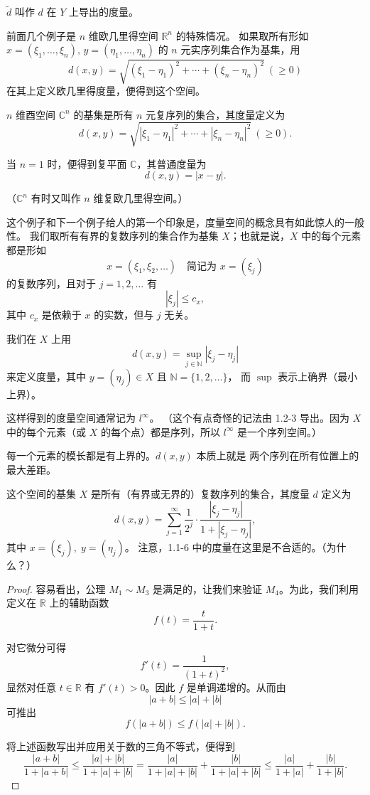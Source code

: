 $\tilde d$ 叫作 $d$ 在 $Y$ 上导出的度量。
\begin{definition}
前面几个例子是 $n$ 维欧几里得空间 $\mathbb{R}^n$ 的特殊情况。
如果取所有形如 $x=(\xi_1,\dots,\xi_n),\, y=(\eta_1,\dots,\eta_n)$ 的
$n$ 元实序列集合作为基集，用
\[
d(x,y) = \sqrt{(\xi_1-\eta_1)^2 + \cdots + (\xi_n-\eta_n)^2}\ (\ge 0) \tag{1.1.6}
\]
在其上定义欧几里得度量，便得到这个空间。

$n$ 维酉空间 $\mathbb{C}^n$ 的基集是所有 $n$ 元复序列的集合，其度量定义为
\[
d(x,y) = \sqrt{|\xi_1-\eta_1|^2 + \cdots + |\xi_n-\eta_n|^2}\ (\ge 0). \tag{1.1.7}
\]

当 $n=1$ 时，便得到复平面 $\mathbb{C}$，其普通度量为
\[
d(x,y) = |x-y|. \tag{1.1.8}
\]

（$\mathbb{C}^n$ 有时又叫作 $n$ 维复欧几里得空间。）
\end{definition}
\begin{definition}
这个例子和下一个例子给人的第一个印象是，度量空间的概念具有如此惊人的一般性。
我们取所有有界的复数序列的集合作为基集 $X$；也就是说，$X$ 中的每个元素都是形如
\[
x = (\xi_1,\xi_2,\dots) \quad \text{简记为 } x=(\xi_j)
\]
的复数序列，且对于 $j=1,2,\dots$ 有
\[
|\xi_j|\le c_x,
\]
其中 $c_x$ 是依赖于 $x$ 的实数，但与 $j$ 无关。

我们在 $X$ 上用
\[
d(x,y) = \sup_{j\in \mathbb{N}} |\xi_j - \eta_j| \tag{1.1.9}
\]
来定义度量，其中 $y=(\eta_j)\in X$ 且 $\mathbb{N}=\{1,2,\dots\}$，
而 $\sup$ 表示上确界（最小上界）。

这样得到的度量空间通常记为 $l^\infty$。
（这个有点奇怪的记法由 1.2-3 导出。因为 $X$ 中的每个元素（或 $X$ 的每个点）都是序列，所以 $l^\infty$ 是一个序列空间。）
\end{definition}
每一个元素的模长都是有上界的。$d(x,y)$ 本质上就是 两个序列在所有位置上的最大差距。
\begin{definition}[1.2-1 序列空间 $s$]
这个空间的基集 $X$ 是所有（有界或无界的）复数序列的集合，其度量 $d$ 定义为
\[
d(x,y) = \sum_{j=1}^{\infty} \frac{1}{2^j} \cdot \frac{|\xi_j - \eta_j|}{1 + |\xi_j - \eta_j|},
\]
其中 $x = (\xi_j), \; y = (\eta_j)$。
注意，1.1-6 中的度量在这里是不合适的。（为什么？）
\end{definition}
\begin{proof}
容易看出，公理 $M_1 \sim M_3$ 是满足的，让我们来验证 $M_4$。为此，我们利用定义在 $\mathbb{R}$ 上的辅助函数
\[
f(t) = \frac{t}{1+t}.
\]

对它微分可得
\[
f'(t) = \frac{1}{(1+t)^2},
\]
显然对任意 $t \in \mathbb{R}$ 有 $f'(t) > 0$。因此 $f$ 是单调递增的。从而由
\[
|a+b| \leq |a| + |b|
\]
可推出
\[
f(|a+b|) \leq f(|a| + |b|).
\]

将上述函数写出并应用关于数的三角不等式，便得到
\[
\frac{|a+b|}{1+|a+b|}
\leq \frac{|a|+|b|}{1+|a|+|b|}
= \frac{|a|}{1+|a|+|b|} + \frac{|b|}{1+|a|+|b|}
\leq \frac{|a|}{1+|a|} + \frac{|b|}{1+|b|}.
\]
\end{proof}
